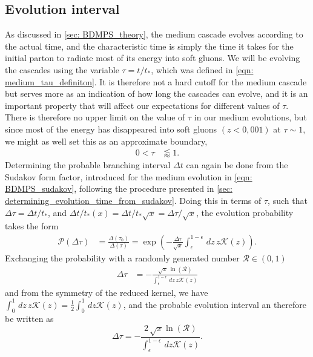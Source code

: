 \documentclass[main.tex]{subfiles}
\begin{document}
\subsection{Evolution interval}
As discussed in \autoref{sec: BDMPS_theory}, the medium cascade evolves according to the actual time, and the characteristic time is simply the time it takes for the initial parton to radiate most of its energy into soft gluons. We will be evolving the cascades using the variable \(\tau = t/t_*\), which was defined in \autoref{eqn: medium_tau_definiton}. It is therefore not a hard cutoff for the medium cascade but serves more as an indication of how long the cascades can evolve, and it is an important property that will affect our expectations for different values of \(\tau\). There is therefore no upper limit on the value of \(\tau\) in our medium evolutions, but since most of the energy has disappeared into soft gluons \((z<0,001)\) at \(\tau \sim 1\), we might as well set this as an approximate boundary,
\begin{align}\label{eqn: medium_evolution_boundaries}
    0 < \tau &\lessapprox 1.
\end{align}
Determining the probable branching interval \(\Delta t\) can again be done from the Sudakov form factor, introduced for the medium evolution in \autoref{eqn: BDMPS_sudakov}, following the procedure presented in \autoref{sec: determining_evolution_time_from_sudakov}. Doing this in terms of \(\tau\), such that \(\Delta \tau = \Delta t/t_*\), and \(\Delta t/t_*(x) = \Delta t/t_* \sqrt{x} = \Delta \tau/\sqrt{x}\), the evolution probability takes the form
\begin{align}
    \mathcal{P}(\Delta \tau) &= \frac{\Delta(\tau_0)}{\Delta(\tau)} = \exp \left(- \frac{\Delta \tau}{\sqrt{x}} \int_\epsilon^{1-\epsilon} \, dz\, z \mathcal{K}(z) \right).
\end{align}
Exchanging the probability with a randomly generated number \(\mathcal{R}\in (0,1)\)
\begin{align}
    \Delta \tau &= -\frac{\sqrt{x}\,\ln(\mathcal{R}) }{\int_\epsilon^{1-\epsilon} \, dz\, z \mathcal{K}(z)}
\end{align}
and from the symmetry of the reduced kernel, we have \(\int_0^1 \, dz\, z \mathcal{K}(z) = \frac{1}{2} \int_0^1 \, dz \mathcal{K}(z)\), and the probable evolution interval an therefore be written as
\begin{equation}\label{eqn: BDMPS_probable_branching_interval_tau}
    \Delta \tau = -\frac{2\, \sqrt{x} \ln(\mathcal{R}) }{\int_\epsilon^{1-\epsilon} \, dz \mathcal{K}(z)}.
\end{equation}
\end{document}
